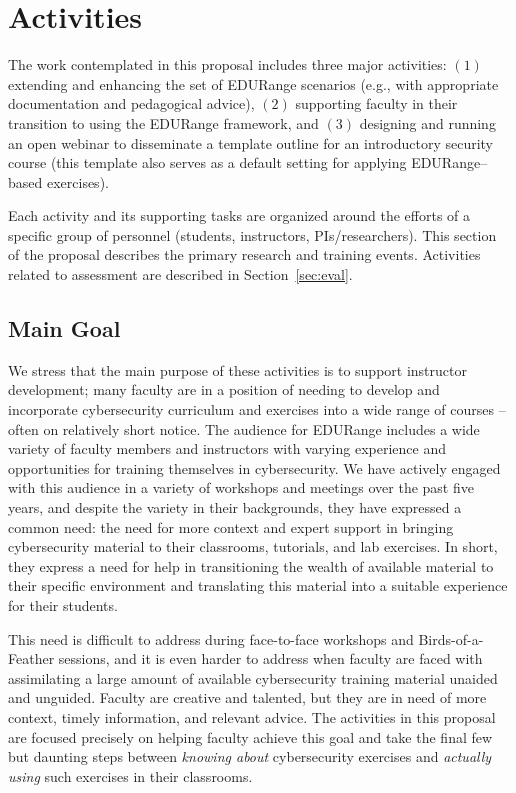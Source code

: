 \section*{Activities}
\label{sec:activities}

The work contemplated in this proposal includes three major
activities: $(1)$ extending and enhancing the set of EDURange
scenarios (e.g., with appropriate documentation and pedagogical
advice), $(2)$ supporting faculty in their transition to using the
EDURange framework, and $(3)$ designing and running an open webinar to
disseminate a template outline for an introductory security course
(this template also serves as a default setting for applying
EDURange--based exercises).

Each activity and its supporting tasks are organized around the
efforts of a specific group of personnel (students, instructors,
PIs/researchers).  This section of the proposal describes the primary
research and training events.  Activities related to assessment are
described in Section~\ref{sec:eval}.

\subsection{Main Goal}

We stress that the main purpose of these activities is to support
instructor development; many faculty are in a position of needing to
develop and incorporate cybersecurity curriculum and exercises into a
wide range of courses -- often on relatively short notice.  The
audience for EDURange includes a wide variety of faculty members and
instructors with varying experience and opportunities for training
themselves in cybersecurity.  We have actively engaged with this
audience in a variety of workshops and meetings over the past five
years, and despite the variety in their backgrounds, they have
expressed a common need: the need for more context and expert support
in bringing cybersecurity material to their classrooms, tutorials, and
lab exercises.  In short, they express a need for help in
transitioning the wealth of available material to their specific
environment and translating this material into a suitable experience
for their students.  

This need is difficult to address during face-to-face workshops and
Birds-of-a-Feather sessions, and it is even harder to address when
faculty are faced with assimilating a large amount of available
cybersecurity training material unaided and unguided.  Faculty are
creative and talented, but they are in need of more context, timely
information, and relevant advice.  The activities in this proposal are
focused precisely on helping faculty achieve this goal and take the
final few but daunting steps between {\em knowing about} cybersecurity
exercises and {\em actually using} such exercises in their classrooms.

